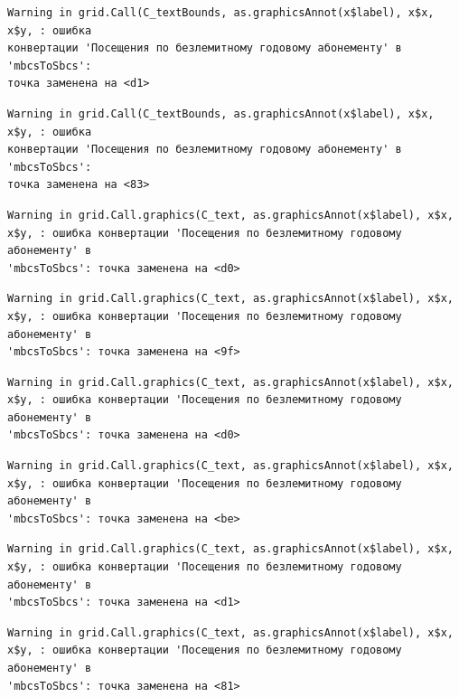 \documentclass[
  letterpaper,
  DIV=11,
  numbers=noendperiod]{scrreprt}
\begin{document}
\begin{verbatim}
Warning in grid.Call(C_textBounds, as.graphicsAnnot(x$label), x$x, x$y, : ошибка
конвертации 'Посещения по безлемитному годовому абонементу' в 'mbcsToSbcs':
точка заменена на <d1>
\end{verbatim}

\begin{verbatim}
Warning in grid.Call(C_textBounds, as.graphicsAnnot(x$label), x$x, x$y, : ошибка
конвертации 'Посещения по безлемитному годовому абонементу' в 'mbcsToSbcs':
точка заменена на <83>
\end{verbatim}

\begin{verbatim}
Warning in grid.Call.graphics(C_text, as.graphicsAnnot(x$label), x$x,
x$y, : ошибка конвертации 'Посещения по безлемитному годовому абонементу' в
'mbcsToSbcs': точка заменена на <d0>
\end{verbatim}

\begin{verbatim}
Warning in grid.Call.graphics(C_text, as.graphicsAnnot(x$label), x$x,
x$y, : ошибка конвертации 'Посещения по безлемитному годовому абонементу' в
'mbcsToSbcs': точка заменена на <9f>
\end{verbatim}

\begin{verbatim}
Warning in grid.Call.graphics(C_text, as.graphicsAnnot(x$label), x$x,
x$y, : ошибка конвертации 'Посещения по безлемитному годовому абонементу' в
'mbcsToSbcs': точка заменена на <d0>
\end{verbatim}

\begin{verbatim}
Warning in grid.Call.graphics(C_text, as.graphicsAnnot(x$label), x$x,
x$y, : ошибка конвертации 'Посещения по безлемитному годовому абонементу' в
'mbcsToSbcs': точка заменена на <be>
\end{verbatim}

\begin{verbatim}
Warning in grid.Call.graphics(C_text, as.graphicsAnnot(x$label), x$x,
x$y, : ошибка конвертации 'Посещения по безлемитному годовому абонементу' в
'mbcsToSbcs': точка заменена на <d1>
\end{verbatim}

\begin{verbatim}
Warning in grid.Call.graphics(C_text, as.graphicsAnnot(x$label), x$x,
x$y, : ошибка конвертации 'Посещения по безлемитному годовому абонементу' в
'mbcsToSbcs': точка заменена на <81>
\end{verbatim}
\end{document}
